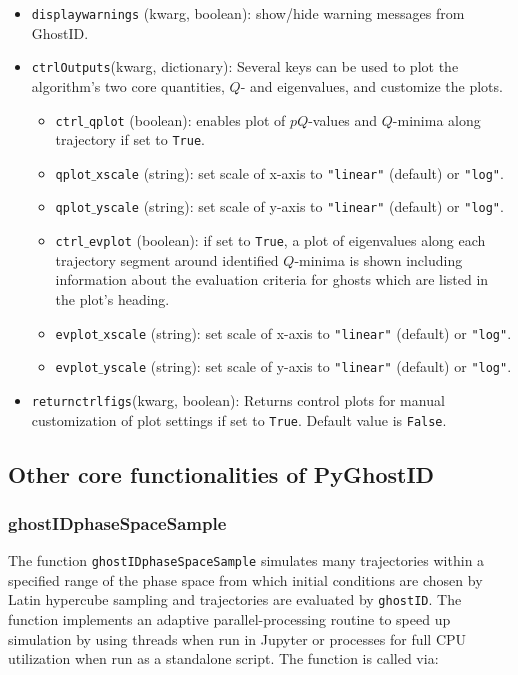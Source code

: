 \documentclass{article}
\theoremstyle{definition}
\begin{document}
\begin{refsection}
\begin{itemize}
\item {\tt display\textunderscore warnings} (kwarg, boolean): show/hide warning messages from GhostID.
\item {\tt ctrlOutputs}(kwarg, dictionary): Several keys can be used to plot the algorithm's two core quantities, $Q$- and eigenvalues, and customize the plots.
\begin{itemize}
    \item {\tt ctrl$\_$qplot} (boolean): enables plot of $pQ$-values and $Q$-minima along trajectory if set to {\tt True}.
    \item {\tt qplot$\_$xscale} (string): set scale of x-axis to {\tt "linear"} (default) or {\tt "log"}.
    \item {\tt qplot$\_$yscale} (string): set scale of y-axis to {\tt "linear"} (default) or {\tt "log"}.
    \item {\tt ctrl$\_$evplot} (boolean): if set to {\tt True}, a plot of eigenvalues along each trajectory segment around identified $Q$-minima is shown including information about the evaluation criteria for ghosts which are listed in the plot's heading.
    \item {\tt evplot$\_$xscale} (string): set scale of x-axis to {\tt "linear"} (default) or {\tt "log"}.
    \item {\tt evplot$\_$yscale} (string): set scale of y-axis to {\tt "linear"} (default) or {\tt "log"}.
\end{itemize}
   \item {\tt return\textunderscore ctrl\textunderscore figs}(kwarg, boolean): Returns control plots for manual customization of plot settings if set to {\tt True}. Default value is {\tt False}.
\end{itemize}

\subsection{Other core functionalities of PyGhostID}\label{subsec:PyGhostIDpackage}

\subsubsection{ghostID\textunderscore phaseSpaceSample}\label{subsec:ghostid_pSS}

The function {\tt ghostID\textunderscore phaseSpaceSample} simulates many trajectories within a specified range of the phase space from which initial conditions are chosen by Latin hypercube sampling and trajectories are evaluated by {\tt ghostID}. The function implements an adaptive parallel-processing routine to speed up simulation by using threads when run in Jupyter or processes for full CPU utilization when run as a standalone script. The function is called via:


\end{refsection}
\end{document}
